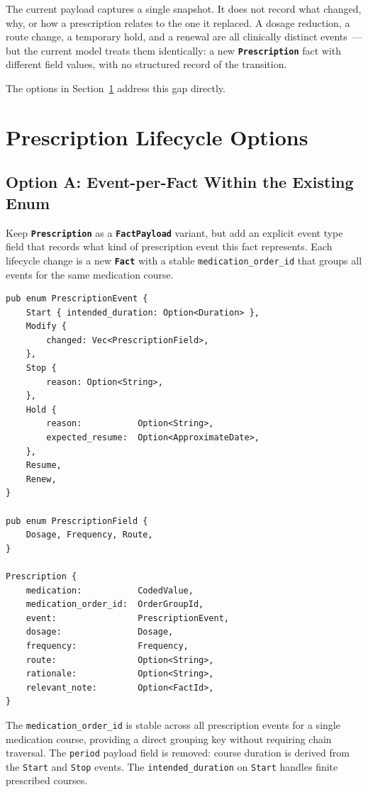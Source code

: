 \documentclass[11pt]{article}
\newcommand{\entity}[1]{\texttt{\textbf{#1}}}
\newcommand{\field}[1]{\texttt{#1}}
\begin{document}
The current payload captures a single snapshot. It does not record
what changed, why, or how a prescription relates to the one it
replaced. A dosage reduction, a route change, a temporary hold, and a
renewal are all clinically distinct events~--- but the current model
treats them identically: a new \entity{Prescription} fact with
different field values, with no structured record of the transition.

The options in Section~\ref{sec:lifecycle} address this gap directly.

\section{Prescription Lifecycle Options}
\label{sec:lifecycle}

\subsection{Option A: Event-per-Fact Within the Existing Enum}
\label{sec:option-a}

Keep \entity{Prescription} as a \entity{FactPayload} variant, but add
an explicit event type field that records what kind of prescription
event this fact represents. Each lifecycle change is a new \entity{Fact}
with a stable \field{medication\_order\_id} that groups all events for
the same medication course.

\begin{lstlisting}
pub enum PrescriptionEvent {
    Start { intended_duration: Option<Duration> },
    Modify {
        changed: Vec<PrescriptionField>,
    },
    Stop {
        reason: Option<String>,
    },
    Hold {
        reason:           Option<String>,
        expected_resume:  Option<ApproximateDate>,
    },
    Resume,
    Renew,
}

pub enum PrescriptionField {
    Dosage, Frequency, Route,
}

Prescription {
    medication:           CodedValue,
    medication_order_id:  OrderGroupId,
    event:                PrescriptionEvent,
    dosage:               Dosage,
    frequency:            Frequency,
    route:                Option<String>,
    rationale:            Option<String>,
    relevant_note:        Option<FactId>,
}
\end{lstlisting}

The \field{medication\_order\_id} is stable across all prescription
events for a single medication course, providing a direct grouping key
without requiring chain traversal. The \field{period} payload field is
removed: course duration is derived from the \field{Start} and
\field{Stop} events. The \field{intended\_duration} on \field{Start}
handles finite prescribed courses.
\end{document}
